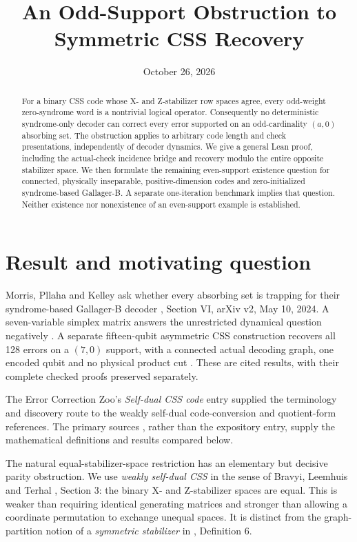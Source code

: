 \documentclass[11pt]{article}
\title{An Odd-Support Obstruction to Symmetric CSS Recovery}
\author{}
\date{October 26, 2026}
\begin{document}
\maketitle
\begin{abstract}
For a binary CSS code whose X- and Z-stabilizer row spaces agree, every odd-weight zero-syndrome word is a nontrivial logical operator. Consequently no deterministic syndrome-only decoder can correct every error supported on an odd-cardinality $(a,0)$ absorbing set. The obstruction applies to arbitrary code length and check presentations, independently of decoder dynamics. We give a general Lean proof, including the actual-check incidence bridge and recovery modulo the entire opposite stabilizer space. We then formulate the remaining even-support existence question for connected, physically inseparable, positive-dimension codes and zero-initialized syndrome-based Gallager-B. A separate one-iteration benchmark implies that question. Neither existence nor nonexistence of an even-support example is established.
\end{abstract}

\section{Result and motivating question}
Morris, Pllaha and Kelley ask whether every absorbing set is trapping for their syndrome-based Gallager-B decoder \cite{mpk}, Section VI, arXiv v2, May 10, 2024. A seven-variable simplex matrix answers the unrestricted dynamical question negatively \cite{simplex}. A separate fifteen-qubit asymmetric CSS construction recovers all 128 errors on a $(7,0)$ support, with a connected actual decoding graph, one encoded qubit and no physical product cut \cite{connected}. These are cited results, with their complete checked proofs preserved separately.

The Error Correction Zoo's \emph{Self-dual CSS code} entry \cite{eczoo} supplied the terminology and discovery route to the weakly self-dual code-conversion and quotient-form references. The primary sources \cite{blt,hhpw}, rather than the expository entry, supply the mathematical definitions and results compared below.

The natural equal-stabilizer-space restriction has an elementary but decisive parity obstruction. We use \emph{weakly self-dual CSS} in the sense of Bravyi, Leemhuis and Terhal \cite{blt}, Section 3: the binary X- and Z-stabilizer spaces are equal. This is weaker than requiring identical generating matrices and stronger than allowing a coordinate permutation to exchange unequal spaces. It is distinct from the graph-partition notion of a \emph{symmetric stabilizer} in \cite{mpk}, Definition 6.
\end{document}
